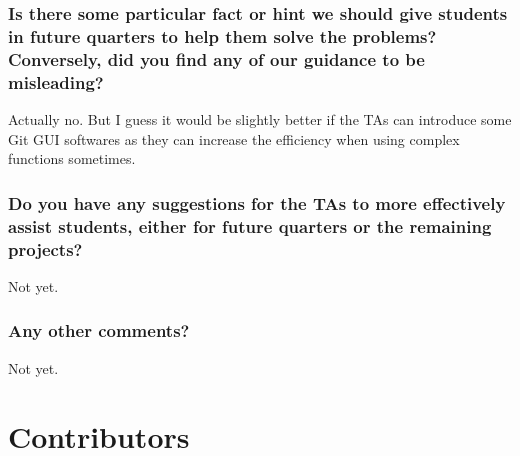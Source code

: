 \documentclass[sigconf, nonacm, balance=false, urlbreakonhyphens=true]{acmart}
\begin{document}
        \subsubsection*{Is there some particular fact or hint we should give students in future quarters to help them solve the problems? Conversely, did you find any of our guidance to be misleading? }

            Actually no. But I guess it would be slightly better if the TAs can introduce some Git GUI softwares as they can increase the efficiency when using complex functions sometimes. 

        \subsubsection*{Do you have any suggestions for the TAs to more effectively assist students, either for future quarters or the remaining projects? }

            Not yet. 

        \subsubsection*{Any other comments? }

            Not yet. 
    
    \section*{Contributors}
\end{document}
